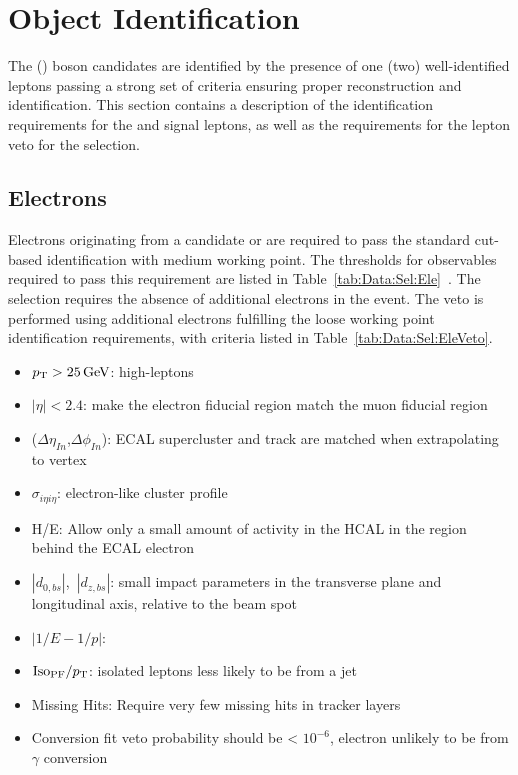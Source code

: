 \section{Object Identification}\label{ch:IdIso}
The \Wpm (\Z) boson candidates are identified by the presence of one (two) well-identified leptons passing a strong set of criteria ensuring proper reconstruction and identification. This section contains a description of the identification requirements for the \wlnu and \zll signal leptons, as well as the requirements for the lepton veto for the \Wpm selection.

\subsection{Electrons}\label{ch:IdIso:Ele}
Electrons originating from a candidate \Wpm or \Z are required to pass the standard cut-based identification with medium working point. The thresholds for observables required to pass this requirement are listed in Table~\ref{tab:Data:Sel:Ele}~\cite{EgammaIDIsoCuts}. The \Wpm selection requires the absence of additional electrons in the event. The veto is performed using additional electrons fulfilling the loose working point identification requirements, with criteria listed in Table~\ref{tab:Data:Sel:EleVeto}. 

\begin{itemize}
    \item $p_{\mathrm{T}} > 25 \,\text{Ge\hspace{-.08em}V}$: high-\pt leptons
    \item $|\eta|< 2.4$: make the electron fiducial region match the muon fiducial region
    \item ($\Delta\eta_{In}$,$\Delta\phi_{In}$): ECAL supercluster and track are matched when extrapolating to vertex
    \item $\sigma_{i\eta i\eta}$: electron-like cluster profile
    \item H/E: Allow only a small amount of activity in the HCAL in the region behind the ECAL electron
    \item $|d_{0,bs}|$,~$|d_{z,bs}|$: small impact parameters in the transverse plane and longitudinal axis, relative to the beam spot
    \item $|1/E-1/p|$: 
    \item $\mathrm{Iso_{PF}}/p_{\mathrm{T}}$: isolated leptons less likely to be from a jet
    \item Missing Hits: Require very few missing hits in tracker layers
    \item Conversion fit veto probability should be < $10^{-6}$, electron unlikely to be from $\gamma$ conversion
\end{itemize}


